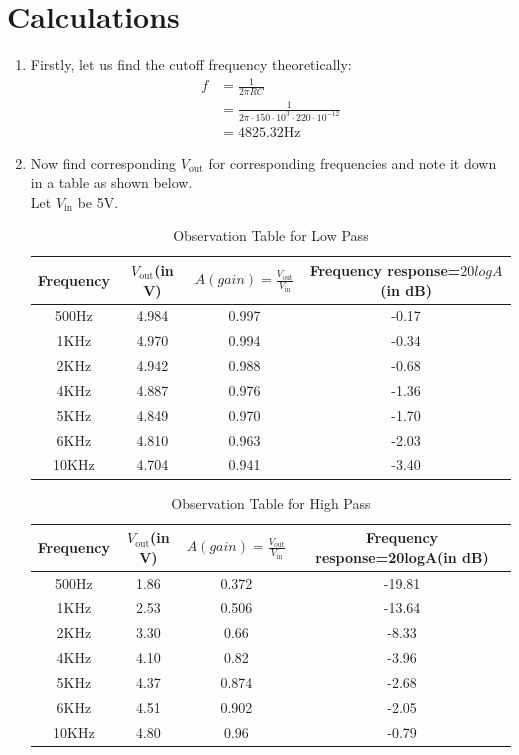\documentclass[a4paper,12pt]{article}
\begin{document}
\section{Calculations}
\begin{enumerate}
\item Firstly, let us find the cutoff frequency theoretically:
\begin{align}
f &= \frac{1}{2\pi RC} \\
&= \frac{1}{2\pi\cdot 150\cdot 10^3 \cdot 220\cdot 10^{-12}} \\
&= 4825.32 \text{Hz}
\end{align}
\item Now find corresponding $V_\text{out}$ for corresponding frequencies and note it down in a table as shown below. \\
Let $V_\text{in}$ be 5V.


\begin{table}[H]
  \centering
  \begin{tabular}{|c|c|c|c|}
    \hline
    \textbf{Frequency} & \textbf{$V_\text{out}$(in V)} & \textbf{$A(gain)=\frac{V_\text{out}}{V_\text{in}}$} & \textbf{Frequency response=$20logA$(in dB)} \\
    \hline
    500Hz & 4.984 & 0.997 & -0.17\\
    \hline
    1KHz & 4.970 & 0.994 & -0.34\\
    \hline 
    2KHz & 4.942 & 0.988 & -0.68\\
    \hline
    4KHz & 4.887 & 0.976 & -1.36\\
    \hline
    5KHz & 4.849 & 0.970 & -1.70\\
    \hline
    6KHz & 4.810 & 0.963 & -2.03\\
    \hline
    10KHz & 4.704 & 0.941 & -3.40\\
    \hline
  \end{tabular}
  \caption{Observation Table for Low Pass}
\end{table}

\begin{table}[H]
  \centering
  \begin{tabular}{|c|c|c|c|}
    \hline
    \textbf{Frequency} & \textbf{$V_\text{out}$(in V)} & \textbf{$A(gain)=\frac{V_\text{out}}{V_\text{in}}$} & \textbf{Frequency response=20logA(in dB)} \\
    \hline
    500Hz & 1.86 & 0.372 & -19.81 \\
    \hline
    1KHz & 2.53 & 0.506 & -13.64\\
    \hline 
    2KHz & 3.30 & 0.66 & -8.33\\
    \hline
    4KHz & 4.10 & 0.82 & -3.96\\
    \hline
    5KHz & 4.37 & 0.874 & -2.68\\
    \hline
    6KHz & 4.51 & 0.902 & -2.05\\
    \hline
    10KHz & 4.80 & 0.96 & -0.79\\
    \hline
  \end{tabular}
  \caption{Observation Table for High Pass}
\end{table}


\end{enumerate}
\end{document}
